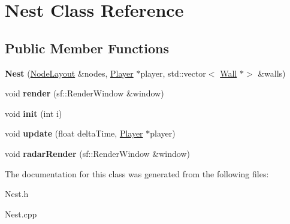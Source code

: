 \hypertarget{class_nest}{}\section{Nest Class Reference}
\label{class_nest}
\subsection*{Public Member Functions}
\begin{DoxyCompactItemize}
\item 
\mbox{\label{class_nest_a316201617cb7b9fa85e30d350ab180d1}} 
{\bfseries Nest} (\mbox{\hyperlink{class_node_layout}{Node\+Layout}} \&nodes, \mbox{\hyperlink{class_player}{Player}} $\ast$player, std\+::vector$<$ \mbox{\hyperlink{class_wall}{Wall}} $\ast$$>$ \&walls)
\item 
\mbox{\label{class_nest_a09d907a3d411da0249c7d0bb5ad7b36c}} 
void {\bfseries render} (sf\+::\+Render\+Window \&window)
\item 
\mbox{\label{class_nest_a9af26a97505ef6ab8a0113ae6e9ddc8e}} 
void {\bfseries init} (int i)
\item 
\mbox{\label{class_nest_a8f402fb76539074b694158a47aafe002}} 
void {\bfseries update} (float delta\+Time, \mbox{\hyperlink{class_player}{Player}} $\ast$player)
\item 
\mbox{\label{class_nest_a01eff531c62869fdf9d41b0aea69e45f}} 
void {\bfseries radar\+Render} (sf\+::\+Render\+Window \&window)
\end{DoxyCompactItemize}


The documentation for this class was generated from the following files\+:\begin{DoxyCompactItemize}
\item 
Nest.\+h\item 
Nest.\+cpp\end{DoxyCompactItemize}
